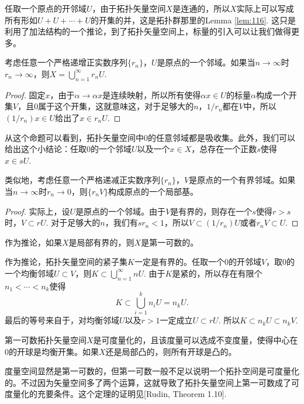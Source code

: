 \begin{para}\label{1.31}
任取一个原点的开邻域$U$，由于拓扑矢量空间$X$是连通的，所以$X$实际上可以写成所有形如$U+U+\cdots+U$的开集的并，这是拓扑群那里的Lemma \ref{lem:116}. 这只是利用了加法结构的一个推论，到了拓扑矢量空间上，标量的引入可以让我们做得更多。
\begin{compactenum}[(a)]
\item 考虑任意一个严格递增正实数序列$\{r_n\}$，$U$是原点的一个邻域。如果当$n\to \infty$时$r_n\to \infty$，则$X=\bigcup_{n=1}^\infty r_n U$.

\begin{proof}
	固定$x$，由于$\alpha\to \alpha x$是连续映射，所以所有使得$\alpha x\in U$的标量$\alpha$构成一个开集$V$，且$0$属于这个开集，这就意味这，对于足够大的$n$，$1/r_n$都在$V$中，所以$(1/r_n) x\in U$给出了$x\in r_n U$.
\end{proof}

从这个命题可以看到，拓扑矢量空间中$0$的任意邻域都是吸收集。此外，我们可以给出这个小结论：任取$0$的一个邻域$U$以及一个$x\in X$，总存在一个正数$s$使得$x\in sU$.

\item 类似地，考虑任意一个严格递减正实数序列$\{r_n\}$，$V$是原点的一个有界邻域。如果当$n\to \infty$时$r_n\to 0$，则$\{r_n V\}$构成原点的一个局部基。

\begin{proof}
	实际上，设$U$是原点的一个邻域。由于$V$是有界的，则存在一个$s$使得$r>s$时，$V\subset rU$. 对于足够大的$n$，我们有$sr_n<1$，所以$V\subset (1/r_n)U$或者$r_n V\subset U$.
\end{proof}

作为推论，如果$X$是局部有界的，则$X$是第一可数的。
\end{compactenum}
\end{para}

作为推论，拓扑矢量空间的紧子集$K$一定是有界的。任取一个$0$的开邻域$V$，取$0$的一个均衡邻域$U\subset V$，则$K\subset \bigcup_{n=1}^\infty nU$. 由于$K$是紧的，所以存在有限个$n_1< \cdots <n_k$使得
\[
	K\subset \bigcup_{i=1}^k n_iU=n_k U.
\]
最后的等号来自于，对均衡邻域$U$以及$r>1$一定成立$U\subset rU$. 所以$K\subset n_k U\subset n_k V$.

\begin{thm}
第一可数拓扑矢量空间$X$是可度量化的，且该度量可以选成不变度量，使得中心在$0$的开球是均衡开集。如果$X$还是局部凸的，则所有开球是凸的。
\end{thm}

度量空间显然是第一可数的，但第一可数一般不足以说明一个拓扑空间是可度量化的。不过因为矢量空间多了两个运算，这就导致了拓扑矢量空间上第一可数成了可度量化的充要条件。这个定理的证明见[Rudin, Theorem 1.10].

